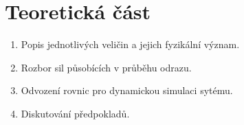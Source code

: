\part{Teoretická část}
\label{part:teoreticka-cast}

\begin{enumerate}
 \item Popis jednotlivých veličin a jejich fyzikální význam.
 \item Rozbor sil působících v průběhu odrazu.
 \item Odvození rovnic pro dynamickou simulaci sytému.
 \item Diskutování předpokladů.
\end{enumerate}

